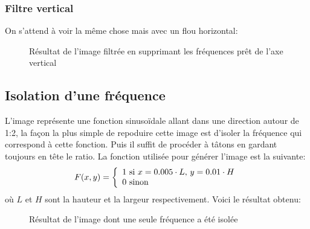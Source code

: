 \documentclass[12pt]{article}
\begin{document}
\subsubsection{Filtre vertical}
On s'attend à voir la même chose mais avec un flou horizontal:
\begin{figure}[ht]
  \centering
  \captionsetup{width=.8\linewidth}
  \caption{Résultat de l'image filtrée en supprimant les fréquences prêt de l'axe vertical}
\end{figure}

\pagebreak
\subsection{Isolation d'une fréquence}
L'image représente une fonction sinusoïdale allant dans une direction autour de 1:2, la façon la plus simple de repoduire cette image est d'isoler la fréquence qui correspond à cette fonction. Puis il suffit de procéder à tâtons en gardant toujours en tête le ratio. La fonction utilisée pour générer l'image est la suivante:
\begin{equation}
  F(x, y) = \left\{
  \begin{array}{ll}
    1$ si $x = 0.005 \cdot L$, $y = 0.01 \cdot H\\
    0$ sinon$
  \end{array}
  \right.
\end{equation}
où $L$ et $H$ sont la hauteur et la largeur respectivement. Voici le résultat obtenu:
\begin{figure}[ht]
  \centering
  \captionsetup{width=.8\linewidth}
  \caption{Résultat de l'image dont une seule fréquence a été isolée}
\end{figure}
\end{document}
